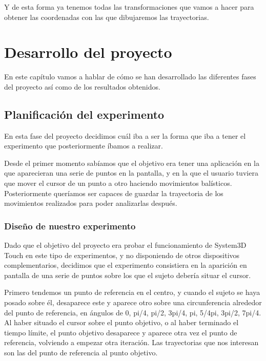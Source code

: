 \documentclass[a4paper,11pt, oneside]{book}
\begin{document}
Y de esta forma ya tenemos todas las transformaciones que vamos a hacer para obtener las coordenadas con las que dibujaremos las trayectorias.


\chapter{Desarrollo del proyecto}




En este capítulo vamos a hablar de cómo se han desarrollado las diferentes fases del proyecto así como de los resultados obtenidos.

\section{Planificación del experimento}

En esta fase del proyecto decidimos cuál iba a ser la forma que iba a tener el experimento que posteriormente íbamos a realizar.

Desde el primer momento sabíamos que el objetivo era tener una aplicación en la que aparecieran una serie de puntos en la pantalla, y en la que el usuario tuviera que mover el cursor de un punto a otro haciendo movimientos balísticos. Posteriormente queríamos ser capaces de guardar la trayectoria de los movimientos realizados para poder analizarlas después.



\subsection{Diseño de nuestro experimento}

Dado que el objetivo del proyecto era probar el funcionamiento de System3D Touch en este tipo de experimentos, y no disponiendo de otros dispositivos complementarios, decidimos que el experimento consistiera en la aparición en pantalla de una serie de puntos sobre los que el sujeto debería situar el cursor.

Primero tendemos un punto de referencia en el centro, y cuando el sujeto se haya posado sobre él, desaparece este y aparece otro sobre una circunferencia alrededor del punto de referencia, en ángulos de 0, pi/4, pi/2, 3pi/4, pi, 5/4pi, 3pi/2, 7pi/4. Al haber situado el cursor sobre el punto objetivo, o al haber terminado el tiempo límite, el punto objetivo desaparece y aparece otra vez el punto de referencia, volviendo a empezar otra iteración. Las trayectorias que nos interesan son las del punto de referencia al punto objetivo.
\end{document}
